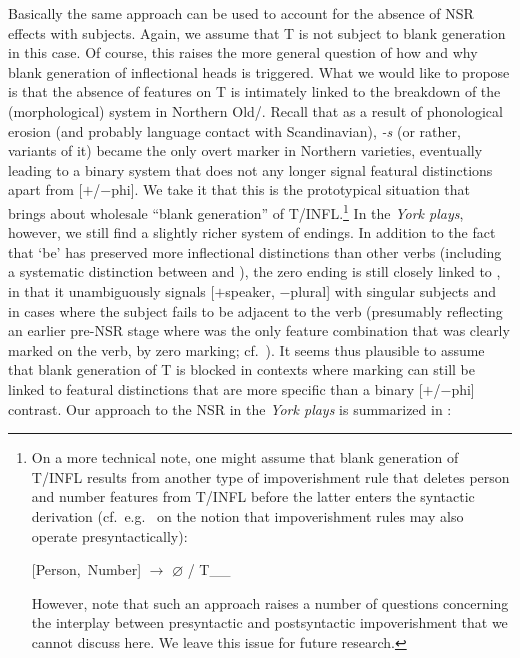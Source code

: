 \documentclass[output=paper]{langsci/langscibook}
\begin{document}
Basically the same approach can be used to account for the absence of \gls{NSR} effects with \Fsg{} subjects. Again, we assume that T is not subject to blank generation in this case. Of course, this raises the more general question of how and why blank generation of inflectional heads is triggered.
What we would like to propose is that the absence of  features on T is
intimately linked to the breakdown of the (morphological)  system in
Northern Old\slash{}. Recall that as a result of phonological
erosion (and probably language contact with Scandinavian), \emph{-s} (or
rather, variants of it) became the only overt  marker in Northern
varieties, eventually leading to a binary  system that does not any
longer signal featural distinctions apart from \mbox{[$+$/$-$phi]}. We take it  that this
is the prototypical situation that brings about wholesale ``blank generation''
of T/INFL.\footnote{On a more technical note, one might assume that blank
    generation of T/INFL results from another type of impoverishment rule that
    deletes person and number features from T/INFL before the latter enters the
    syntactic derivation (cf.\ e.g.\ \citealt{Mueller:2006} on the notion that
    impoverishment rules may also operate presyntactically):

    \begin{exe}
         \mbox{[Person, Number]} {$\rightarrow$ $\varnothing$} / T\_\_\
    \end{exe}

    However, note that such an approach raises a number of questions concerning the
    interplay between presyntactic and postsyntactic impoverishment that we cannot
    discuss here. We leave this issue for future research.} In the \emph{York
plays}, however, we still find a slightly richer system of endings. In addition
to the fact that `be' has preserved more inflectional distinctions than other
verbs (including a systematic distinction between \Ssg{} and \Spl{}), the zero
ending is still closely linked to \Fsg{}, in that it unambiguously signals
[$+$speaker, $-$plural] with singular subjects and in cases where the subject fails
to be adjacent to the verb (presumably reflecting an earlier pre-\gls{NSR}
stage where \Fsg{} was the only feature combination that was clearly marked on
the verb, by zero marking; cf.\ \Cref{tab:trips:10.2}). It seems thus plausible to
assume that blank generation of T is blocked in contexts where \isi{agreement}
marking can still be linked to featural distinctions that are more specific
than a binary [$+$/$-$phi] contrast. Our approach to the \gls{NSR} in the
\emph{York plays} is summarized in \REF{ex:10:29}:
\end{document}
